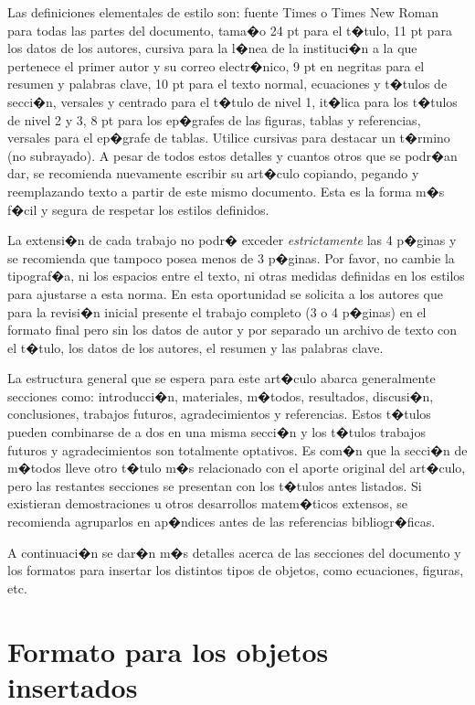\documentclass[conference,a4paper,10pt,oneside,final]{tfmpd}
\begin{document}
Las definiciones elementales de estilo son: fuente Times o Times New Roman para todas las partes del documento, tama�o 24 pt para el t�tulo, 11 pt para los datos de los autores, cursiva para la l�nea de la instituci�n a la que pertenece el primer autor y su correo electr�nico, 9 pt en negritas para el resumen y palabras clave, 10 pt para el texto normal, ecuaciones y t�tulos de secci�n, versales y centrado para el t�tulo de nivel 1, it�lica para los t�tulos de nivel 2 y 3, 8 pt para los ep�grafes de las figuras, tablas y referencias, versales para el ep�grafe de tablas. Utilice cursivas para destacar un t�rmino (no subrayado). A pesar de todos estos detalles y cuantos otros que se podr�an dar, se recomienda nuevamente escribir su art�culo copiando, pegando y reemplazando texto a partir de este mismo documento. Esta es la forma m�s f�cil y segura de respetar los estilos definidos.

La extensi�n de cada trabajo no podr� exceder \textit{estrictamente} las 4 p�ginas y se recomienda que tampoco posea menos de 3 p�ginas. Por favor, no cambie la tipograf�a, ni los espacios entre el texto, ni otras medidas definidas en los estilos para ajustarse a esta norma. En esta oportunidad se solicita a los autores que para la revisi�n inicial presente el trabajo completo (3 o 4 p�ginas) en el formato final pero sin los datos de autor y por separado un archivo de texto con el t�tulo, los datos de los autores, el resumen y las palabras clave.

La estructura general que se espera para este art�culo abarca generalmente secciones como: introducci�n, materiales, m�todos, resultados, discusi�n, conclusiones, trabajos futuros, agradecimientos y referencias. Estos t�tulos pueden combinarse de a dos en una misma secci�n y los t�tulos trabajos futuros y agradecimientos son totalmente optativos. Es com�n que la secci�n de m�todos lleve otro t�tulo m�s relacionado con el aporte original del art�culo, pero las restantes secciones se presentan con los t�tulos antes listados. Si existieran demostraciones u otros desarrollos matem�ticos extensos, se recomienda agruparlos en ap�ndices antes de las referencias bibliogr�ficas.

A continuaci�n se dar�n m�s detalles acerca de las secciones del documento y los formatos para insertar los distintos tipos de objetos, como ecuaciones, figuras, etc.

\section{Formato para los objetos insertados}
\end{document}
